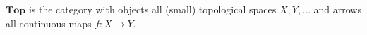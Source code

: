 $\mathbf{Top}$ is the category with objects all (small) topological spaces $X, Y, \ldots$ and arrows all continuous maps $f: X \to Y$.
